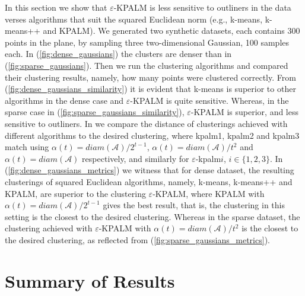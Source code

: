 In this section we show that $\varepsilon$-KPALM is less sensitive to outliners in the data verses algorithms that suit the squared Euclidean norm (e.g., k-means, k-means++ and KPALM). We generated two synthetic datasets, each contains 300 points in the plane, by sampling three two-dimensional Gaussian, 100 samples each. In (\ref{fig:dense_gaussians}) the clusters are denser than in (\ref{fig:sparse_gaussians}).
Then we run the clustering algorithms and compared their clustering results, namely, how many points were clustered correctly. From (\ref{fig:dense_gaussians_similarity}) it is evident that k-means is superior to other algorithms in the dense case and $\varepsilon$-KPALM is quite sensitive. Whereas, in the sparse case in (\ref{fig:sparse_gaussians_similarity}), $\varepsilon$-KPALM is superior, and less sensitive to outliners. 
In  we compare the distance of clusterings achieved with different algorithms to the desired clustering, where kpalm1, kpalm2 and kpalm3 match using $\alpha(t)=diam(\mathcal{A})/2^{t-1}$, $\alpha(t)=diam(\mathcal{A})/t^2$ and $\alpha(t)=diam(\mathcal{A})$ respectively, and similarly for $\varepsilon$-kpalm$i$, $i \in \{1,2,3\}$. 
In (\ref{fig:dense_gaussians_metrics}) we witness that for dense dataset, the resulting clusterings of squared Euclidean algorithms, namely, k-means, k-means++ and KPALM, are superior to the clustering $\varepsilon$-KPALM, where KPALM with $\alpha(t)=diam(\mathcal{A})/2^{t-1}$ gives the best result, that is, the clustering in this setting is the closest to the desired clustering. Whereas in the sparse dataset, the clustering achieved with $\varepsilon$-KPALM with $\alpha(t)=diam(\mathcal{A})/t^2$ is the closest to the desired clustering, as reflected from (\ref{fig:sparse_gaussians_metrics}).

\section{Summary of Results}

